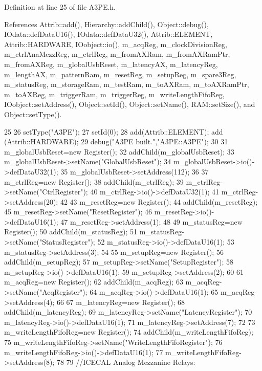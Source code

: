 Definition at line 25 of file A3PE.h.

References Attrib::add(), Hierarchy::addChild(), Object::debug(), IOdata::defDataU16(), IOdata::defDataU32(), Attrib::ELEMENT, Attrib::HARDWARE, IOobject::io(), m\_\-acqReg, m\_\-clockDivisionReg, m\_\-ctrlAnaMezzReg, m\_\-ctrlReg, m\_\-fromAXRam, m\_\-fromAXRamPtr, m\_\-fromAXReg, m\_\-globalUsbReset, m\_\-latencyAX, m\_\-latencyReg, m\_\-lengthAX, m\_\-patternRam, m\_\-resetReg, m\_\-setupReg, m\_\-spare3Reg, m\_\-statusReg, m\_\-storageRam, m\_\-testRam, m\_\-toAXRam, m\_\-toAXRamPtr, m\_\-toAXReg, m\_\-triggerRam, m\_\-triggerReg, m\_\-writeLengthFifoReg, IOobject::setAddress(), Object::setId(), Object::setName(), RAM::setSize(), and Object::setType().


\begin{DoxyCode}
25         {
26     setType("A3PE");
27     setId(0);
28     add(Attrib::ELEMENT); add (Attrib::HARDWARE);
29     debug("A3PE built.","A3PE::A3PE");
30 
31     m_globalUsbReset=new Register();
32     addChild(m_globalUsbReset);
33     m_globalUsbReset->setName("GlobalUsbReset");
34     m_globalUsbReset->io()->defDataU32(1);
35     m_globalUsbReset->setAddress(112);
36 
37     m_ctrlReg=new Register();
38     addChild(m_ctrlReg);
39     m_ctrlReg->setName("CtrlRegister");
40     m_ctrlReg->io()->defDataU32(1);
41     m_ctrlReg->setAddress(20);
42 
43     m_resetReg=new Register();
44     addChild(m_resetReg);
45     m_resetReg->setName("ResetRegister");
46     m_resetReg->io()->defDataU16(1);
47     m_resetReg->setAddress(1);
48 
49     m_statusReg=new Register();
50     addChild(m_statusReg);
51     m_statusReg->setName("StatusRegister");
52     m_statusReg->io()->defDataU16(1);
53     m_statusReg->setAddress(3);
54 
55     m_setupReg=new Register();
56     addChild(m_setupReg);
57     m_setupReg->setName("SetupRegister");
58     m_setupReg->io()->defDataU16(1);
59     m_setupReg->setAddress(2);
60 
61     m_acqReg=new Register();
62     addChild(m_acqReg);
63     m_acqReg->setName("AcqRegister");
64     m_acqReg->io()->defDataU16(1);
65     m_acqReg->setAddress(4);
66 
67     m_latencyReg=new Register();
68     addChild(m_latencyReg);
69     m_latencyReg->setName("LatencyRegister");
70     m_latencyReg->io()->defDataU16(1);
71     m_latencyReg->setAddress(7);
72 
73     m_writeLengthFifoReg=new Register();
74     addChild(m_writeLengthFifoReg);
75     m_writeLengthFifoReg->setName("WriteLengthFifoRegister");
76     m_writeLengthFifoReg->io()->defDataU16(1);
77     m_writeLengthFifoReg->setAddress(8);
78 
79     //ICECAL Analog Mezzanine Relays:
}
\end{DoxyCode}
